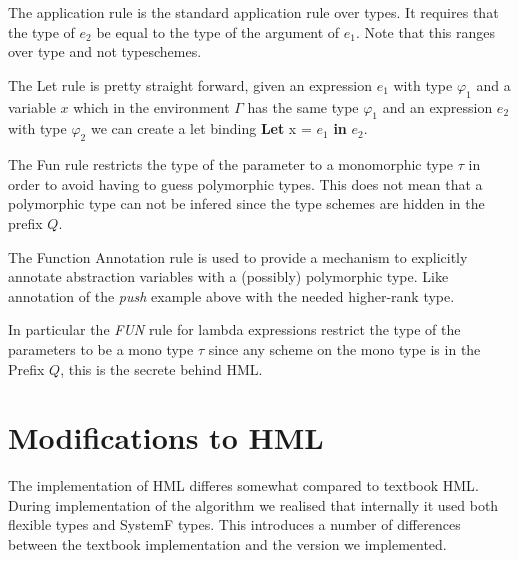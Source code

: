 \documentclass[12pt, a4paper, oneside]{article}
\begin{document}
The application rule is the standard application rule over types. It requires that the type of $e_2$ be equal to the type of the argument of $e_1$. Note that this ranges over type and not typeschemes.

\begin{prooftree}
\end{prooftree}

The Let rule is pretty straight forward, given an expression $e_1$ with type $\varphi_1$ and a variable $x$ which in the environment $\Gamma$ has the same type $\varphi_1$ and an expression $e_2$ with type $\varphi_2$ we can create a let binding \textbf{Let} x = $e_1$ \textbf{in} $e_2$.

\begin{prooftree}
\end{prooftree}

The Fun rule restricts the type of the parameter to a monomorphic type $\tau$ in order to avoid having to guess polymorphic types. This does not mean that a polymorphic type can not be infered since the type schemes are hidden in the prefix $Q$.

\begin{prooftree}
\end{prooftree}

The Function Annotation rule is used to provide a mechanism to explicitly annotate abstraction variables with a (possibly) polymorphic type. Like annotation of the \textit{push} example above with the needed higher-rank type.

In particular the \textit{FUN} rule for lambda expressions restrict the type of the parameters to be a mono type $\tau$ since any scheme on the mono type is in the Prefix $Q$, this is the secrete behind HML.

\section{Modifications to HML}
The implementation of HML differes somewhat compared to textbook HML\cite{HML}. During implementation of the algorithm we realised that internally it used both flexible types and SystemF types. This introduces a number of differences between the textbook implementation and the version we implemented.
\end{document}
